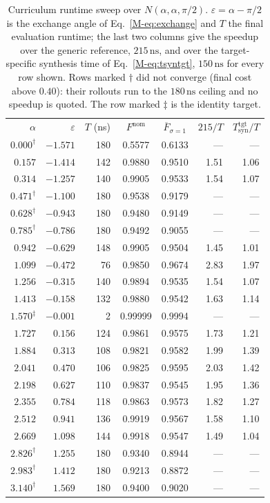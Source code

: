 \documentclass[aps,prx,twocolumn,superscriptaddress,nofootinbib,amsmath,amssymb,floatfix]{revtex4-2}
\newcommand{\Ntgt}[2]{N(#1,#1,#2)}
\newcommand{\Fbar}{\overline{F}}
\newcommand{\Tsyn}{T_{\mathrm{syn}}}
\newcommand{\ns}{\,\mathrm{ns}}
\begin{document}
\begin{table}[t]
\caption{Curriculum runtime sweep over $\Ntgt{\alpha}{\pi/2}$. $\varepsilon=\alpha-\pi/2$ is the
exchange angle of Eq.~\eqref{M-eq:exchange} and $T$ the final evaluation runtime; the last two columns give
the speedup over the generic reference, $215\ns$, and over the target-specific synthesis time of
Eq.~\eqref{M-eq:tsyntgt}, $150\ns$ for every row shown. Rows marked $\dagger$ did not converge (final cost
above $0.40$): their rollouts run to the $180\ns$ ceiling and no speedup is quoted. The row marked
$\ddagger$ is the identity target.}
\label{tab:runtime}
\footnotesize
\begin{ruledtabular}
\begin{tabular}{rrrccrr}
$\alpha$ & $\varepsilon$ & $T$ (ns) & $F^{\mathrm{nom}}$ & $\Fbar_{\sigma=1}$ & $215/T$ & $\Tsyn^{\mathrm{tgt}}/T$\\
\colrule
$0.000^\dagger$ & $-1.571$ & 180 & 0.5577 & 0.6133 & --- & ---\\
$0.157$ & $-1.414$ & 142 & 0.9880 & 0.9510 & 1.51 & 1.06\\
$0.314$ & $-1.257$ & 140 & 0.9905 & 0.9533 & 1.54 & 1.07\\
$0.471^\dagger$ & $-1.100$ & 180 & 0.9538 & 0.9179 & --- & ---\\
$0.628^\dagger$ & $-0.943$ & 180 & 0.9480 & 0.9149 & --- & ---\\
$0.785^\dagger$ & $-0.786$ & 180 & 0.9492 & 0.9055 & --- & ---\\
$0.942$ & $-0.629$ & 148 & 0.9905 & 0.9504 & 1.45 & 1.01\\
$1.099$ & $-0.472$ & 76 & 0.9850 & 0.9674 & 2.83 & 1.97\\
$1.256$ & $-0.315$ & 140 & 0.9894 & 0.9535 & 1.54 & 1.07\\
$1.413$ & $-0.158$ & 132 & 0.9880 & 0.9542 & 1.63 & 1.14\\
$1.570^\ddagger$ & $-0.001$ & 2 & 0.99999 & 0.9994 & --- & ---\\
$1.727$ & $0.156$ & 124 & 0.9861 & 0.9575 & 1.73 & 1.21\\
$1.884$ & $0.313$ & 108 & 0.9821 & 0.9582 & 1.99 & 1.39\\
$2.041$ & $0.470$ & 106 & 0.9825 & 0.9595 & 2.03 & 1.42\\
$2.198$ & $0.627$ & 110 & 0.9837 & 0.9545 & 1.95 & 1.36\\
$2.355$ & $0.784$ & 118 & 0.9863 & 0.9573 & 1.82 & 1.27\\
$2.512$ & $0.941$ & 136 & 0.9919 & 0.9567 & 1.58 & 1.10\\
$2.669$ & $1.098$ & 144 & 0.9918 & 0.9547 & 1.49 & 1.04\\
$2.826^\dagger$ & $1.255$ & 180 & 0.9340 & 0.8944 & --- & ---\\
$2.983^\dagger$ & $1.412$ & 180 & 0.9213 & 0.8872 & --- & ---\\
$3.140^\dagger$ & $1.569$ & 180 & 0.9400 & 0.9020 & --- & ---\\
\end{tabular}
\end{ruledtabular}
\end{table}
\end{document}
